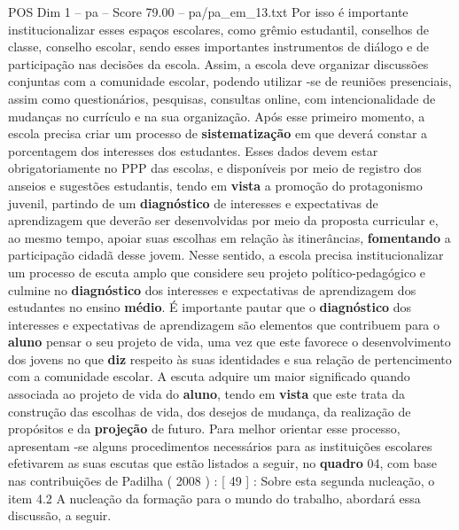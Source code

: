 \begin{textsample}{POS Dim 1 – pa – Score 79.00 – pa/pa\_em\_13.txt}
Por isso é importante institucionalizar esses espaços escolares, como grêmio estudantil, conselhos de classe, conselho escolar, sendo esses importantes instrumentos de diálogo e de participação nas decisões da escola.
Assim, a escola deve organizar discussões conjuntas com a comunidade escolar, podendo utilizar -se de reuniões presenciais, assim como questionários, pesquisas, consultas online, com intencionalidade de mudanças no currículo e na sua organização.
Após esse primeiro momento, a escola precisa criar um processo de \textbf{sistematização} em que deverá constar a porcentagem dos interesses dos estudantes.
Esses dados devem estar obrigatoriamente no PPP das escolas, e disponíveis por meio de registro dos anseios e sugestões estudantis, tendo em \textbf{vista} a promoção do protagonismo juvenil, partindo de um \textbf{diagnóstico} de interesses e expectativas de aprendizagem que deverão ser desenvolvidas por meio da proposta curricular e, ao mesmo tempo, apoiar suas escolhas em relação às itinerâncias, \textbf{fomentando} a participação cidadã desse jovem.
Nesse sentido, a escola precisa institucionalizar um processo de escuta amplo que considere seu projeto político-pedagógico e culmine no \textbf{diagnóstico} dos interesses e expectativas de aprendizagem dos estudantes no ensino \textbf{médio}.
É importante pautar que o \textbf{diagnóstico} dos interesses e expectativas de aprendizagem são elementos que contribuem para o \textbf{aluno} pensar o seu projeto de vida, uma vez que este favorece o desenvolvimento dos jovens no que \textbf{diz} respeito às suas identidades e sua relação de pertencimento com a comunidade escolar.
A escuta adquire um maior significado quando associada ao projeto de vida do \textbf{aluno}, tendo em \textbf{vista} que este trata da construção das escolhas de vida, dos desejos de mudança, da realização de propósitos e da \textbf{projeção} de futuro.
Para melhor orientar esse processo, apresentam -se alguns procedimentos necessários para as instituições escolares efetivarem as suas escutas que estão listados a seguir, no \textbf{quadro} 04, com base nas contribuições de Padilha ( 2008 ) : [ 49 ] : Sobre esta segunda nucleação, o item 4.2 A nucleação da formação para o mundo do trabalho, abordará essa discussão, a seguir.

\end{textsample}
